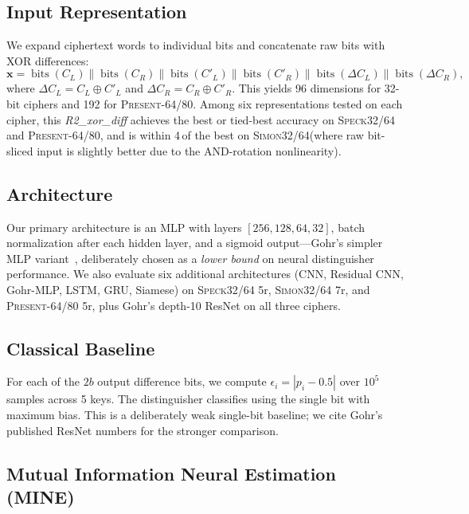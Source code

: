 \documentclass[runningheads]{llncs}
\newcommand{\speck}{\textsc{Speck32/64}\xspace}
\newcommand{\simon}{\textsc{Simon32/64}\xspace}
\newcommand{\present}{\textsc{Present-64/80}\xspace}
\newcommand{\pp}{\,\text{pp}}  %
\begin{document}
\subsection{Input Representation}

We expand ciphertext words to individual bits and concatenate raw bits with XOR differences:
\begin{equation}
\label{eq:repr}
\mathbf{x} = \operatorname{bits}(C_L) \| \operatorname{bits}(C_R) \| \operatorname{bits}(C'_L) \| \operatorname{bits}(C'_R) \| \operatorname{bits}(\Delta C_L) \| \operatorname{bits}(\Delta C_R),
\end{equation}
where $\Delta C_L = C_L \oplus C'_L$ and $\Delta C_R = C_R \oplus C'_R$.
This yields 96 dimensions for 32-bit ciphers and 192 for \present.
Among six representations tested on each cipher, this \emph{R2\_xor\_diff} achieves the best or tied-best accuracy on \speck and \present, and is within 4\pp of the best on \simon (where raw bit-sliced input is slightly better due to the AND-rotation nonlinearity).

\subsection{Architecture}

Our primary architecture is an MLP with layers $[256, 128, 64, 32]$, batch normalization after each hidden layer, and a sigmoid output---Gohr's simpler MLP variant~\cite{gohr2019}, deliberately chosen as a \emph{lower bound} on neural distinguisher performance.
We also evaluate six additional architectures (CNN, Residual CNN, Gohr-MLP, LSTM, GRU, Siamese) on \speck 5r, \simon 7r, and \present 5r, plus Gohr's depth-10 ResNet on all three ciphers.

\subsection{Classical Baseline}

For each of the $2b$ output difference bits, we compute $\epsilon_i = |p_i - 0.5|$ over $10^5$ samples across 5 keys.
The distinguisher classifies using the single bit with maximum bias.
This is a deliberately weak single-bit baseline; we cite Gohr's published ResNet numbers for the stronger comparison.

\subsection{Mutual Information Neural Estimation (MINE)}
\label{sec:method-mine}
\end{document}
